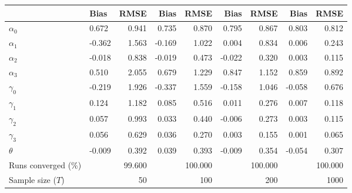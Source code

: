 
\begin{tabular}[t]{llrrrrrrr}
\toprule
  & Bias & RMSE & Bias & RMSE & Bias & RMSE & Bias & RMSE\\
\midrule
$\alpha_{0}$ & 0.672 & 0.941 & 0.735 & 0.870 & 0.795 & 0.867 & 0.803 & 0.812\\
$\alpha_{1}$ & -0.362 & 1.563 & -0.169 & 1.022 & 0.004 & 0.834 & 0.006 & 0.243\\
$\alpha_{2}$ & -0.018 & 0.838 & -0.019 & 0.473 & -0.022 & 0.320 & 0.003 & 0.115\\
$\alpha_{3}$ & 0.510 & 2.055 & 0.679 & 1.229 & 0.847 & 1.152 & 0.859 & 0.892\\
$\gamma_{0}$ & -0.219 & 1.926 & -0.337 & 1.559 & -0.158 & 1.046 & -0.058 & 0.676\\
$\gamma_{1}$ & 0.124 & 1.182 & 0.085 & 0.516 & 0.011 & 0.276 & 0.007 & 0.118\\
$\gamma_{2}$ & 0.057 & 0.993 & 0.033 & 0.440 & -0.006 & 0.273 & 0.003 & 0.115\\
$\gamma_{3}$ & 0.056 & 0.629 & 0.036 & 0.270 & 0.003 & 0.155 & 0.001 & 0.065\\
$\theta$ & -0.009 & 0.392 & 0.039 & 0.393 & -0.009 & 0.354 & -0.054 & 0.307\\
Runs converged (\%) &  & 99.600 &  & 100.000 &  & 100.000 &  & 100.000\\
Sample size ($T$) &  & 50 &  & 100 &  & 200 &  & 1000\\
\bottomrule
\end{tabular}
